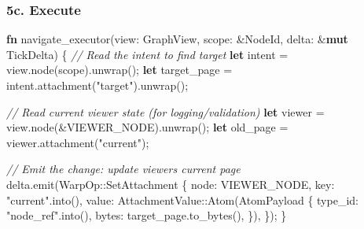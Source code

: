 \documentclass[
  11pt,
]{book}
\newenvironment{Shaded}{}{}
\newcommand{\CommentTok}[1]{\textcolor[rgb]{0.38,0.63,0.69}{\textit{#1}}}
\newcommand{\KeywordTok}[1]{\textcolor[rgb]{0.00,0.44,0.13}{\textbf{#1}}}
\newcommand{\NormalTok}[1]{#1}
\newcommand{\OperatorTok}[1]{\textcolor[rgb]{0.40,0.40,0.40}{#1}}
\newcommand{\PreprocessorTok}[1]{\textcolor[rgb]{0.74,0.48,0.00}{#1}}
\newcommand{\StringTok}[1]{\textcolor[rgb]{0.25,0.44,0.63}{#1}}
\begin{document}
\subsubsection{5c. Execute}\label{c.-execute}

\begin{Shaded}
\begin{Highlighting}[]
\KeywordTok{fn}\NormalTok{ navigate\_executor(view}\OperatorTok{:}\NormalTok{ GraphView}\OperatorTok{,}\NormalTok{ scope}\OperatorTok{:} \OperatorTok{\&}\NormalTok{NodeId}\OperatorTok{,}\NormalTok{ delta}\OperatorTok{:} \OperatorTok{\&}\KeywordTok{mut}\NormalTok{ TickDelta) }\OperatorTok{\{}
    \CommentTok{// Read the intent to find target}
    \KeywordTok{let}\NormalTok{ intent }\OperatorTok{=}\NormalTok{ view}\OperatorTok{.}\NormalTok{node(scope)}\OperatorTok{.}\NormalTok{unwrap()}\OperatorTok{;}
    \KeywordTok{let}\NormalTok{ target\_page }\OperatorTok{=}\NormalTok{ intent}\OperatorTok{.}\NormalTok{attachment(}\StringTok{"target"}\NormalTok{)}\OperatorTok{.}\NormalTok{unwrap()}\OperatorTok{;}

    \CommentTok{// Read current viewer state (for logging/validation)}
    \KeywordTok{let}\NormalTok{ viewer }\OperatorTok{=}\NormalTok{ view}\OperatorTok{.}\NormalTok{node(}\OperatorTok{\&}\NormalTok{VIEWER\_NODE)}\OperatorTok{.}\NormalTok{unwrap()}\OperatorTok{;}
    \KeywordTok{let}\NormalTok{ old\_page }\OperatorTok{=}\NormalTok{ viewer}\OperatorTok{.}\NormalTok{attachment(}\StringTok{"current"}\NormalTok{)}\OperatorTok{;}

    \CommentTok{// Emit the change: update viewer\textquotesingle{}s current page}
\NormalTok{    delta}\OperatorTok{.}\NormalTok{emit(}\PreprocessorTok{WarpOp::}\NormalTok{SetAttachment }\OperatorTok{\{}
\NormalTok{        node}\OperatorTok{:}\NormalTok{ VIEWER\_NODE}\OperatorTok{,}
\NormalTok{        key}\OperatorTok{:} \StringTok{"current"}\OperatorTok{.}\NormalTok{into()}\OperatorTok{,}
\NormalTok{        value}\OperatorTok{:} \PreprocessorTok{AttachmentValue::}\NormalTok{Atom(AtomPayload }\OperatorTok{\{}
\NormalTok{            type\_id}\OperatorTok{:} \StringTok{"node\_ref"}\OperatorTok{.}\NormalTok{into()}\OperatorTok{,}
\NormalTok{            bytes}\OperatorTok{:}\NormalTok{ target\_page}\OperatorTok{.}\NormalTok{to\_bytes()}\OperatorTok{,}
        \OperatorTok{\}}\NormalTok{)}\OperatorTok{,}
    \OperatorTok{\}}\NormalTok{)}\OperatorTok{;}
\OperatorTok{\}}
\end{Highlighting}
\end{Shaded}
\end{document}
